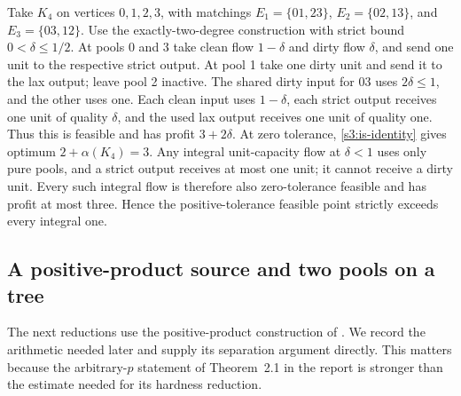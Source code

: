 \begin{example}\label{s3:tolerance-example}
Take $K_4$ on vertices $0,1,2,3$, with matchings
$E_1=\{01,23\}$, $E_2=\{02,13\}$, and $E_3=\{03,12\}$.
Use the exactly-two-degree construction with strict bound
$0<\delta\le1/2$. At pools 0 and 3 take clean flow $1-\delta$ and
dirty flow $\delta$, and send one unit to the respective strict output.
At pool 1 take one dirty unit and send it to the lax output; leave pool
2 inactive. The shared dirty input for $03$ uses $2\delta\le1$, and
the other uses one. Each clean input uses $1-\delta$, each strict output
receives one unit of quality $\delta$, and the used lax output receives
one unit of quality one. Thus this is feasible and has profit
$3+2\delta$. At zero tolerance, \eqref{s3:is-identity} gives optimum
$2+\alpha(K_4)=3$. Any integral unit-capacity flow at $\delta<1$
uses only pure pools, and a strict output receives at most one unit;
it cannot receive a dirty unit. Every such integral flow is therefore
also zero-tolerance feasible and has profit at most three. Hence the
positive-tolerance feasible point strictly exceeds every integral one.
\end{example}

\subsection{A positive-product source and two pools on a tree}\label{s3:positive-product}

The next reductions use the positive-product construction of
\citet[METR95-13, Sections~2--3, pp.~2--7]{s3:matsui1996}. We record the
arithmetic needed later and supply its separation argument directly.
This matters because the arbitrary-$p$ statement of Theorem~2.1 in the
report is stronger than the estimate needed for its hardness reduction.


